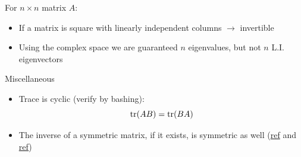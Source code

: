 \documentclass[12pt]{article} %
\begin{document}
For $n \times n$ matrix $A$:
\begin{itemize}[topsep=-1pt, itemsep =-1pt]
    \item If a matrix is square with linearly independent columns $\rightarrow$ invertible
    \item Using the complex space we are guaranteed $n$ eigenvalues, but not $n$ L.I. eigenvectors
    
\end{itemize}


Miscellaneous
\begin{itemize}[topsep=-1pt, itemsep =-1pt]
    \item Trace is cyclic (verify by bashing):
    \begin{equation*}
        \text{tr}(AB) = \text{tr}(BA)
    \end{equation*}
    \item The inverse of a symmetric matrix, if it exists, is symmetric as well (\href{https://math.stackexchange.com/questions/340233/transpose-of-inverse-vs-inverse-of-transpose}{ref} and \href{https://math.stackexchange.com/questions/325082/is-the-inverse-of-a-symmetric-matrix-also-symmetric}{ref}) \\
    
\end{itemize}

\newpage
\end{document}
